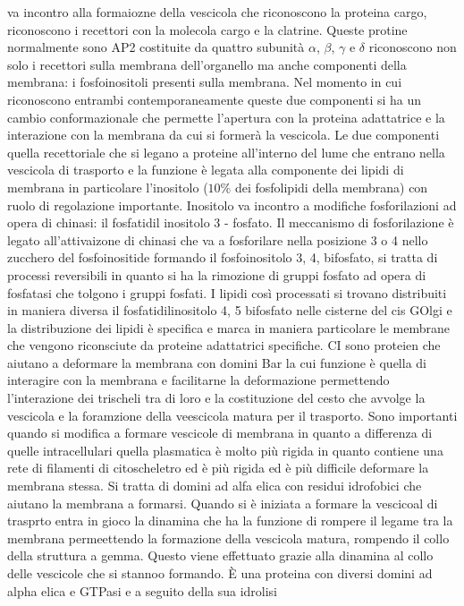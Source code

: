 va incontro alla formaiozne della vescicola che riconoscono la proteina cargo, riconoscono i recettori con la molecola cargo e la clatrine. Queste protine normalmente sono AP2 costituite
da quattro subunit\`a $\alpha$, $\beta$, $\gamma$ e $\delta$ riconoscono non solo i recettori sulla membrana dell'organello ma anche componenti della membrana: i fosfoinositoli presenti
sulla membrana. Nel momento in cui riconoscono entrambi contemporaneamente queste due componenti si ha un cambio conformazionale che permette l'apertura con la proteina adattatrice e la
interazione con la  membrana da cui si former\`a la vescicola. Le due componenti quella recettoriale che si legano a proteine all'interno del lume che entrano nella vescicola di trasporto
e la funzione \`e legata alla componente dei lipidi di membrana in particolare l'inositolo ($10\%$ dei fosfolipidi della membrana) con ruolo di regolazione importante. Inositolo va 
incontro a modifiche fosforilazioni ad opera di chinasi: il fosfatidil inositolo 3 - fosfato. Il meccanismo di fosforilazione \`e legato all'attivaizone di chinasi che va a
fosforilare nella posizione 3 o 4 nello zucchero del fosfoinositide formando il fosfoinositolo 3, 4, bifosfato, si tratta di processi reversibili in quanto si ha la rimozione di gruppi
fosfato ad opera di fosfatasi che tolgono i gruppi fosfati. I lipidi cos\`i processati si trovano distribuiti in maniera diversa il fosfatidilinositolo 4, 5 bifosfato nelle cisterne del
cis GOlgi e la distribuzione dei lipidi \`e specifica e marca in maniera particolare le membrane che vengono riconsciute da proteine adattatrici specifiche. CI sono proteien che 
aiutano a deformare la membrana con domini Bar la cui funzione \`e quella di interagire con la membrana e facilitarne la deformazione permettendo l'interazione dei trischeli tra di loro
e la costituzione del cesto che avvolge la vescicola e la foramzione della veescicola matura per il trasporto. Sono importanti quando si modifica a formare vescicole di membrana in 
quanto a differenza di quelle intracellulari quella plasmatica \`e molto pi\`u rigida in quanto contiene una rete di filamenti di citoscheletro ed \`e pi\`u rigida ed \`e pi\`u difficile
deformare la membrana stessa. Si tratta di domini ad alfa elica con residui idrofobici che aiutano la membrana a formarsi. Quando si \`e iniziata a formare la vescicoal di trasprto
entra in gioco la dinamina che ha la funzione di rompere il legame tra la membrana permeettendo la formazione della vescicola matura, rompendo il collo della struttura a gemma. 
Questo viene effettuato grazie alla dinamina al collo delle vescicole che si stannoo formando. \`E una proteina con diversi domini ad  alpha elica e GTPasi e a seguito della sua idrolisi
